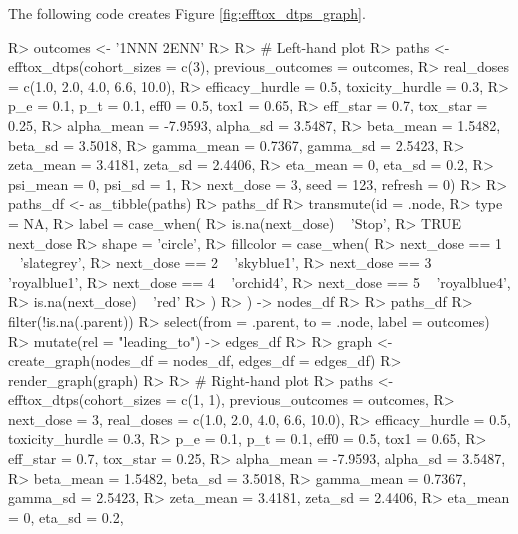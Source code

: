 \documentclass[article]{jss}
\begin{document}
The following code creates Figure \ref{fig:efftox_dtps_graph}.

\begin{CodeChunk}

\begin{CodeInput}
R> outcomes <- '1NNN 2ENN'
R> 
R> # Left-hand plot
R> paths <- efftox_dtps(cohort_sizes = c(3), previous_outcomes = outcomes, 
R>                      real_doses = c(1.0, 2.0, 4.0, 6.6, 10.0),
R>                      efficacy_hurdle = 0.5, toxicity_hurdle = 0.3,
R>                      p_e = 0.1, p_t = 0.1, eff0 = 0.5, tox1 = 0.65,
R>                      eff_star = 0.7, tox_star = 0.25,
R>                      alpha_mean = -7.9593, alpha_sd = 3.5487,
R>                      beta_mean = 1.5482, beta_sd = 3.5018,
R>                      gamma_mean = 0.7367, gamma_sd = 2.5423,
R>                      zeta_mean = 3.4181, zeta_sd = 2.4406,
R>                      eta_mean = 0, eta_sd = 0.2,
R>                      psi_mean = 0, psi_sd = 1, 
R>                      next_dose = 3, seed = 123, refresh = 0)
R> 
R> paths_df <- as_tibble(paths)
R> paths_df %
R>   transmute(id = .node,
R>             type = NA,
R>             label = case_when(
R>               is.na(next_dose) ~ 'Stop',
R>               TRUE ~ next_dose %
R>             shape = 'circle',
R>             fillcolor = case_when(
R>               next_dose == 1 ~ 'slategrey',
R>               next_dose == 2 ~ 'skyblue1',
R>               next_dose == 3 ~ 'royalblue1',
R>               next_dose == 4 ~ 'orchid4',
R>               next_dose == 5 ~ 'royalblue4',
R>               is.na(next_dose) ~ 'red'
R>             )
R>   ) -> nodes_df
R> 
R> paths_df %
R>   filter(!is.na(.parent)) %
R>   select(from = .parent, to = .node, label = outcomes) %
R>   mutate(rel = "leading_to") -> edges_df
R> 
R> graph <- create_graph(nodes_df = nodes_df, edges_df = edges_df)
R> render_graph(graph)
R> 
R> # Right-hand plot
R> paths <- efftox_dtps(cohort_sizes = c(1, 1), previous_outcomes = outcomes, 
R>                      next_dose = 3, real_doses = c(1.0, 2.0, 4.0, 6.6, 10.0),
R>                      efficacy_hurdle = 0.5, toxicity_hurdle = 0.3,
R>                      p_e = 0.1, p_t = 0.1, eff0 = 0.5, tox1 = 0.65,
R>                      eff_star = 0.7, tox_star = 0.25,
R>                      alpha_mean = -7.9593, alpha_sd = 3.5487,
R>                      beta_mean = 1.5482, beta_sd = 3.5018,
R>                      gamma_mean = 0.7367, gamma_sd = 2.5423,
R>                      zeta_mean = 3.4181, zeta_sd = 2.4406,
R>                      eta_mean = 0, eta_sd = 0.2,

\end{CodeInput}
\end{CodeChunk}
\end{document}
